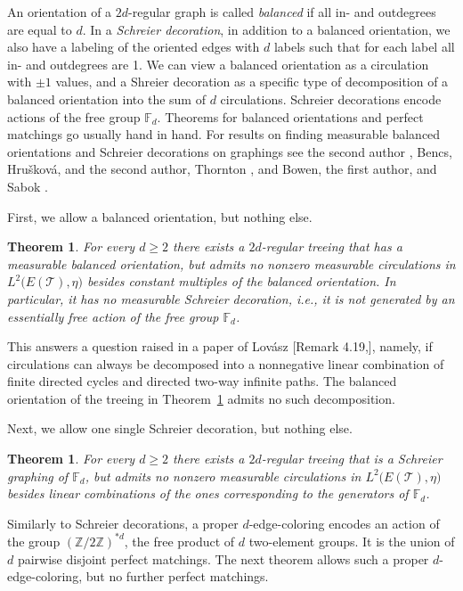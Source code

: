 \documentclass[10pt]{article}
\theoremstyle{plain}
\newtheorem{theorem}[lemma]{Theorem}
\theoremstyle{remark}
\newcommand{\1}{\mathbbm{1}}
\newcommand{\mcT}{\mathcal{T}}
\numberwithin{equation}{section}
\begin{document}
An orientation of a $2d$-regular graph is called \emph{balanced} if all in- and outdegrees are equal to $d$. In a \emph{Schreier decoration}, in addition to a balanced orientation, we also have a labeling of the oriented edges with $d$ labels such that for each label all in- and outdegrees are 1. We can view a balanced orientation as a circulation with $\pm1$ values, and a Shreier decoration as a specific type of decomposition of a balanced orientation into the sum of $d$ circulations. Schreier decorations encode actions of the free group $\mathbb{F}_d$. Theorems for balanced orientations and perfect matchings go usually hand in hand. For results on finding measurable balanced orientations and Schreier decorations on graphings see the second author \cite{toth2021invariant}, Bencs, Hru\v{s}kov\'a, and the second author\cite{bencs2024factor_euclidean, bencs2024factor_nonamen}, Thornton \cite{thornton2022orienting}, and Bowen, the first author, and Sabok  \cite{bowen2021perfect}.

First, we allow a balanced orientation, but nothing else.
\begin{theorem} \label{thm:balanced_orientation}
For every $d\geq2$ there exists a $2d$-regular treeing that has a measurable balanced orientation, but admits no nonzero measurable circulations in $L^2\big(E(\mcT), \eta\big)$ besides constant multiples of the balanced orientation. In particular, it has no measurable Schreier decoration, i.e., it is not generated by an essentially free action of the free group $\mathbb{F}_d$. 
\end{theorem}
This answers a question raised in a paper of Lovász [Remark 4.19,\cite{lovasz2021flows}], namely, if circulations can always be decomposed into a nonnegative linear combination of finite directed cycles and directed two-way infinite paths. The balanced orientation of the treeing in Theorem~\ref{thm:balanced_orientation} admits no such decomposition. 

Next, we allow one single Schreier decoration, but nothing else.

\begin{theorem} \label{thm:Schreier_graphing}
For every $d\geq2$ there exists a $2d$-regular treeing that is a Schreier graphing of $\mathbb{F}_d$, but admits no nonzero measurable circulations in $L^2\big(E(\mcT), \eta \big)$ besides linear combinations of the ones corresponding to the generators of $\mathbb{F}_d$.
\end{theorem}

Similarly to Schreier decorations, a proper $d$-edge-coloring encodes an action of the group $(\mathbb{Z}/2\mathbb{Z})^{*d}$, the free product of $d$ two-element groups. It is the union of $d$ pairwise disjoint perfect matchings. The next theorem allows such a proper $d$-edge-coloring, but no further perfect matchings.
\end{document}
